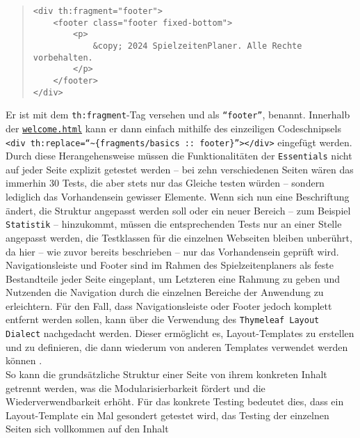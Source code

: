 \begin{quote}
\begin{verbatim}
<div th:fragment="footer">
    <footer class="footer fixed-bottom">
        <p>
            &copy; 2024 SpielzeitenPlaner. Alle Rechte vorbehalten. 
        </p>
    </footer>
</div>
\end{verbatim}
\end{quote}

Er ist mit dem \texttt{th:fragment}-Tag versehen und als \texttt{``footer''}, 
benannt. Innerhalb der \href{https://github.com/FlorianOhmes/bat_spielzeitenplaner/blob/main/spielzeitenplaner/src/main/resources/templates/welcome.html}{\texttt{welcome.html}}
kann er dann einfach mithilfe des einzeiligen Codeschnipsels
\texttt{<div \linebreak th:replace=``\textasciitilde\{fragments/basics :: footer\}''></div>}
eingefügt werden. \\ 
Durch diese Herangehensweise müssen die Funktionalitäten der \texttt{Essentials} 
nicht auf jeder Seite explizit getestet werden -- bei zehn verschiedenen Seiten 
wären das immerhin 30 Tests, die aber stets nur das Gleiche testen würden -- 
sondern lediglich das Vorhandensein gewisser Elemente. Wenn sich nun eine 
Beschriftung ändert, die Struktur angepasst werden soll oder ein neuer Bereich -- 
zum Beispiel \texttt{Statistik} -- hinzukommt, müssen die entsprechenden Tests nur 
an einer Stelle angepasst werden, die Testklassen für die einzelnen Webseiten 
bleiben unberührt, da hier -- wie zuvor bereits beschrieben -- nur das 
Vorhandensein geprüft wird. \\ 
Navigationsleiste und Footer sind im Rahmen des Spielzeitenplaners als feste 
Bestandteile jeder Seite eingeplant, um Letzteren eine Rahmung zu geben und 
Nutzenden die Navigation durch die einzelnen Bereiche der Anwendung zu erleichtern. 
Für den Fall, dass Navigationsleiste oder Footer jedoch komplett entfernt werden 
sollen, kann über die Verwendung des \texttt{Thymeleaf Layout Dialect} nachgedacht 
werden. Dieser ermöglicht es, Layout-Templates zu erstellen und zu definieren, die 
dann wiederum von anderen Templates verwendet werden können 
\cite{borowiec2024layouts}. \\ 
So kann die grundsätzliche Struktur einer Seite von ihrem konkreten Inhalt getrennt 
werden, was die Modularisierbarkeit fördert und die Wiederverwendbarkeit erhöht. 
Für das konkrete Testing bedeutet dies, dass ein Layout-Template ein Mal gesondert 
getestet wird, das Testing der einzelnen Seiten sich vollkommen auf den Inhalt 
